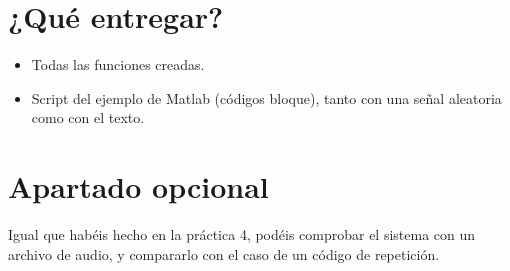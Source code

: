 \documentclass[es,practica]{uah}
\begin{document}
\section{¿Qué entregar?}
\begin{itemize}
	\item Todas las funciones creadas.
	\item Script del ejemplo de Matlab (códigos bloque), tanto con una señal aleatoria como con el texto.
\end{itemize}

\section{Apartado opcional}

Igual que habéis hecho en la práctica 4, podéis comprobar el sistema con un archivo de audio, y compararlo con el caso de un código de repetición. 

\end{document}
